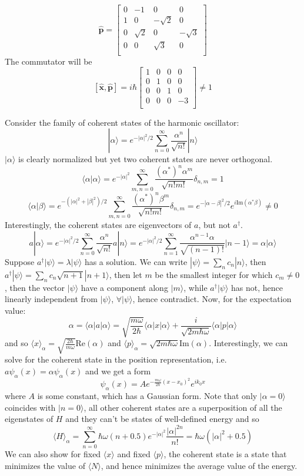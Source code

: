 \documentclass[a4paper]{article}
\begin{document}
$$
\mathbf{\hat{p}}=\begin{bmatrix}0&-1&0&0\\1&0&-\sqrt{2}&0\\0&\sqrt{2}&0&-\sqrt{3}\\0&0&\sqrt{3}&0\\\end{bmatrix}
$$
The commutator will be
$$
[\mathbf{\hat{x}},\mathbf{\hat{p}}]=i\hbar\begin{bmatrix}1&0&0&0\\0&1&0&0\\0&0&1&0\\0&0&0&-3\\\end{bmatrix}\neq1
$$
\newpage
\begin{eg}
Consider the family of coherent states of the harmonic oscillator:
$$|\alpha\rangle=e^{-|\alpha|^2/2}\sum_{n=0}^\infty\frac{\alpha^n}{\sqrt{n!}}|n\rangle$$
$|\alpha\rangle$ is clearly normalized but yet two coherent states are never orthogonal.
$$\langle\alpha|\alpha\rangle=e^{-|\alpha|^2}\sum_{m,n=0}^\infty\frac{(\alpha^*)^n\alpha^m}{\sqrt{n!m!}}\delta_{n,m}=1$$
$$\langle\alpha|\beta\rangle=e^{-(|\alpha|^2+|\beta|^2)/2}\sum_{m,n=0}^\infty\frac{(\alpha^*)^n\beta^m}{\sqrt{n!m!}}\delta_{n,m}=e^{-|\alpha-\beta|^2/2}e^{i\text{Im}(\alpha^*\beta)}\neq0$$
Interestingly, the coherent states are eigenvectors of $a$, but not $a^\dag$.
$$a|\alpha\rangle=e^{-|\alpha|^2/2}\sum_{n=0}^\infty\frac{\alpha^n}{\sqrt{n!}}a|n\rangle=e^{-|\alpha|^2/2}\sum_{n=1}^\infty\frac{\alpha^{n-1}\alpha}{\sqrt{(n-1)!}}|n-1\rangle=\alpha|\alpha\rangle$$
Suppose $a^\dag|\psi\rangle=\lambda|\psi\rangle$ has a solution. We can write $|\psi\rangle=\sum_nc_n|n\rangle$, then $a^\dag|\psi\rangle=\sum_nc_n\sqrt{n+1}|n+1\rangle$, then let $m$ be the smallest integer for which $c_m\neq 0$, then the vector $|\psi\rangle$ have a component along $|m\rangle$, while $a^\dag|\psi\rangle$ has not, hence linearly independent from $|\psi\rangle$, $\forall|\psi\rangle$, hence contradict. Now, for the expectation value:
$$\alpha=\langle\alpha|a|\alpha\rangle=\sqrt{\frac{m\omega}{2\hbar}}\langle\alpha|x|\alpha\rangle+\frac{i}{\sqrt{2m\hbar\omega}}\langle\alpha|p|\alpha\rangle$$
and so $\langle x\rangle_\alpha=\sqrt{\frac{2\hbar}{m\omega}}\text{Re}(\alpha)$ and $\langle p\rangle_\alpha=\sqrt{2m\hbar\omega}\text{Im}(\alpha)$. Interestingly, we can solve for the coherent state in the position representation, i.e. $a\psi_\alpha(x)=\alpha\psi_\alpha(x)$ and we get a form
$$\psi_\alpha(x)=Ae^{-\frac{m\omega}{2\hbar}(x-x_0)^2}e^{ik_0x}$$
where $A$ is some constant, which has a Gaussian form. Note that only $|\alpha=0\rangle$ coincides with $|n=0\rangle$, all other coherent states are a superposition of all the eigenstates of $H$ and they can't be states of well-defined energy and so
$$\langle H\rangle_\alpha=\sum_{n=0}^\infty \hbar\omega(n+0.5)e^{-|\alpha|^2}\frac{|\alpha|^{2n}}{n!}=\hbar\omega(|\alpha|^2+0.5)$$
We can also show for fixed $\langle x\rangle$ and fixed $\langle p\rangle$, the coherent state is a state that minimizes the value of $\langle N\rangle$, and hence minimizes the average value of the energy.
\end{eg}
\end{document}
